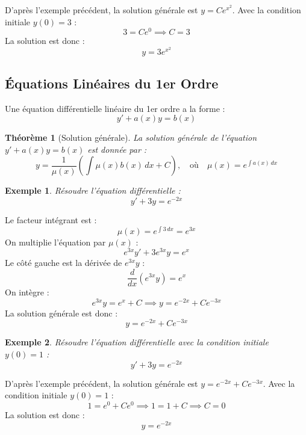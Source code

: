 \documentclass[12pt]{article}
\newtheorem{theorem}{Théorème}[section]
\newtheorem{example}{Exemple}[section]
\begin{document}
\begin{mybox}[Solution]
D'après l'exemple précédent, la solution générale est $y = C e^{x^2}$. Avec la condition initiale $y(0) = 3$ :
\[
3 = C e^{0} \implies C = 3
\]
La solution est donc :
\[
\boxed{y = 3 e^{x^2}}
\]
\end{mybox}

\subsection{Équations Linéaires du 1er Ordre}
\begin{myequation}
Une équation différentielle linéaire du 1er ordre a la forme :
\[
y' + a(x) y = b(x)
\]
\end{myequation}

\begin{theorem}[Solution générale]
La solution générale de l'équation $y' + a(x) y = b(x)$ est donnée par :
\[
y = \frac{1}{\mu(x)} \left( \int \mu(x) b(x) \, dx + C \right), \quad \text{où} \quad \mu(x) = e^{\int a(x) \, dx}
\]
\end{theorem}

\begin{example}
Résoudre l'équation différentielle :
\[
y' + 3y = e^{-2x}
\]
\end{example}

\begin{mybox}[Solution]
Le facteur intégrant est :
\[
\mu(x) = e^{\int 3 \, dx} = e^{3x}
\]
On multiplie l'équation par $\mu(x)$ :
\[
e^{3x} y' + 3 e^{3x} y = e^{x}
\]
Le côté gauche est la dérivée de $e^{3x} y$ :
\[
\frac{d}{dx} \left( e^{3x} y \right) = e^{x}
\]
On intègre :
\[
e^{3x} y = e^{x} + C \implies y = e^{-2x} + C e^{-3x}
\]
La solution générale est donc :
\[
\boxed{y = e^{-2x} + C e^{-3x}}
\]
\end{mybox}

\begin{example}
Résoudre l'équation différentielle avec la condition initiale $y(0) = 1$ :
\[
y' + 3y = e^{-2x}
\]
\end{example}

\begin{mybox}[Solution]
D'après l'exemple précédent, la solution générale est $y = e^{-2x} + C e^{-3x}$. Avec la condition initiale $y(0) = 1$ :
\[
1 = e^{0} + C e^{0} \implies 1 = 1 + C \implies C = 0
\]
La solution est donc :
\[
\boxed{y = e^{-2x}}
\]
\end{mybox}
\end{document}
